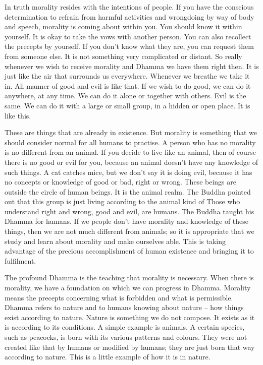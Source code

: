 In truth morality resides with the intentions of people. If you have the conscious determination to refrain from harmful activities and wrongdoing by way of body and speech, morality is coming about within you. You should know it within yourself. It is okay to take the vows with another person. You can also recollect the precepts by yourself. If you don't know what they are, you can request them from someone else. It is not something very complicated or distant. So really whenever we wish to receive morality and Dhamma we have them right then. It is just like the air that surrounds us everywhere. Whenever we breathe we take it in. All manner of good and evil is like that. If we wish to do good, we can do it anywhere, at any time. We can do it alone or together with others. Evil is the same. We can do it with a large or small group, in a hidden or open place. It is like this.

These are things that are already in existence. But morality is something that we should consider normal for all humans to practise. A person who has no morality is no different from an animal. If you decide to live like an animal, then of course there is no good or evil for you, because an animal doesn't have any knowledge of such things. A cat catches mice, but we don't say it is doing evil, because it has no concepts or knowledge of good or bad, right or wrong. These beings are outside the circle of human beings. It is the animal realm. The Buddha pointed out that this group is just living according to the animal kind of  Those who understand right and wrong, good and evil, are humans. The Buddha taught his Dhamma for humans. If we people don't have morality and knowledge of these things, then we are not much different from animals; so it is \mbox{appropriate} that we study and learn about morality and make ourselves able. This is taking advantage of the precious accomplishment of human existence and bringing it to fulfilment.

The profound Dhamma is the teaching that morality is necessary. When there is morality, we have a foundation on which we can progress in Dhamma. Morality means the precepts concerning what is forbidden and what is permissible. Dhamma refers to nature and to humans knowing about nature -- how things exist according to nature. Nature is something we do not compose. It exists as it is according to its conditions. A simple example is animals. A certain species, such as peacocks, is born with its various patterns and colours. They were not created like that by humans or modified by humans; they are just born that way according to nature. This is a little example of how it is in nature.

